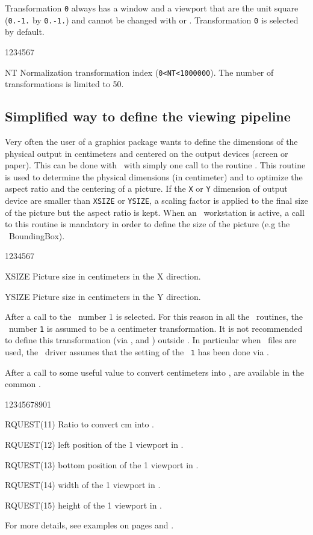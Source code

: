 Transformation {\tt0} always has a window and a viewport that are the unit
square ({\tt0.-1.} by {\tt0.-1.}) and cannot be changed with  or
. Transformation {\tt0} is selected by default.
\Pdesc
\begin{DLtt}{1234567}
\item[NT] Normalization transformation index ({\tt 0<NT<1000000}). The number of transformations is
          limited to 50.
\end{DLtt}
%
\subsection{Simplified way to define the viewing pipeline}
Very often the user of a graphics package wants to define the dimensions of
the physical output in centimeters and centered on the output devices (screen or
paper). This can be done with \HIGZ~with simply one call to the routine
.
\Action
{}
This routine is used to determine the physical dimensions (in centimeter)
and to optimize the aspect ratio and the centering of a picture.
If the {\tt X} or {\tt Y} dimension of output device are smaller than
{\tt XSIZE} or {\tt YSIZE}, a scaling factor is applied to the final size
of the picture but the aspect ratio is kept.
When an \EPS~workstation is active, a call to this routine is mandatory
in order to define the size of the picture (e.g the \PS~{\sf BoundingBox}).
\Pdesc
\begin{DLtt}{1234567}
\item[XSIZE] Picture size in centimeters in the X direction.
\item[YSIZE] Picture size in centimeters in the Y direction.
\end{DLtt}
\par
After a call to  the \NT~number 1 is selected. For this reason
in all the \HIGZ~routines, the \NT~number {\tt 1} is assumed to be a centimeter
transformation. It is not recommended to define this transformation (via
,  and ) outside . In particular
when \PS~files are used, the \PS~driver assumes that the setting of the
\NT~{\tt 1} has been done via .

After a call to  some useful value to convert centimeters into
\NDC{}, are available in the common \QUEST.
\begin{DLtt}{12345678901}
\item[RQUEST(11)] Ratio to convert cm into \NDC.
\item[RQUEST(12)] left position of the  \NT{} 1 viewport in \NDC.
\item[RQUEST(13)] bottom position of the \NT{} 1 viewport in \NDC.
\item[RQUEST(14)] width of the \NT{} 1 viewport in \NDC.
\item[RQUEST(15)] height of the \NT{} 1 viewport in \NDC.
\end{DLtt}
For more details, see examples on pages \pageref{HIEX1} and \pageref{HIEX4}.

